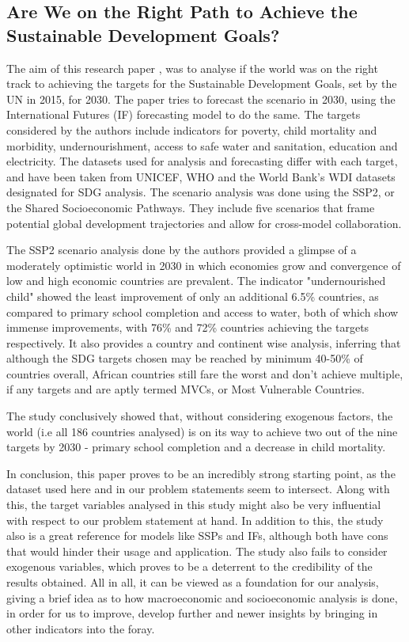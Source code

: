 \documentclass[conference]{IEEEtran}
\begin{document}
\subsection{Are We on the Right Path to Achieve the Sustainable Development Goals?}
The aim of this research paper \cite{SDG}, was to analyse if the world was on the right track to achieving the targets for the Sustainable Development Goals, set by the UN in 2015, for 2030. The paper tries to forecast the scenario in 2030, using the International Futures (IF) forecasting model to do the same. The targets considered by the authors include indicators for poverty, child mortality and morbidity, undernourishment, access to safe water and sanitation, education and electricity. The datasets used for analysis and forecasting differ with each target, and have been taken from UNICEF, WHO and the World Bank's WDI datasets designated for SDG analysis.\newline
The scenario analysis was done using the SSP2, or the Shared Socioeconomic Pathways. They include five scenarios that frame potential global development trajectories and allow for cross-model collaboration.

The SSP2 scenario analysis done by the authors provided a glimpse of a moderately optimistic world in 2030 in which economies grow and convergence of low and high economic countries are prevalent. The indicator "undernourished child" showed the least improvement of only an additional 6.5\% countries, as compared to primary school completion and access to water, both of which show immense improvements, with 76\% and 72\% countries achieving the targets respectively. It also provides a country and continent wise analysis, inferring that although the SDG targets chosen may be reached by minimum 40-50\% of countries overall, African countries still fare the worst and don't achieve multiple, if any targets and are aptly termed MVCs, or Most Vulnerable Countries.

The study conclusively showed that, without considering exogenous factors, the world (i.e all 186 countries analysed) is on its way to achieve two out of the nine targets by 2030 - primary school completion and a decrease in child mortality. 

In conclusion, this paper proves to be an incredibly strong starting point, as the dataset used here and in our problem statements seem to intersect. Along with this, the target variables analysed in this study might also be very influential with respect to our problem statement at hand. In addition to this, the study also is a great reference for models like SSPs and IFs, although both have cons that would hinder their usage and application. The study also fails to consider exogenous variables, which proves to be a deterrent to the credibility of the results obtained. All in all, it can be viewed as a foundation for our analysis, giving a brief idea as to how macroeconomic and socioeconomic analysis is done, in order for us to improve, develop further and newer insights by bringing in other indicators into the foray.
\end{document}

